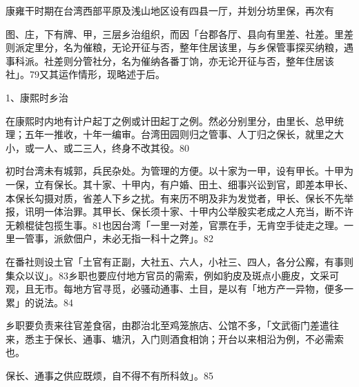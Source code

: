 
康雍干时期在台湾西部平原及浅山地区设有四县一厅，并划分坊里保，再次有

\vfill
\begin{BookNotes}
\end{BookNotes}

\noindent 图、庄，下有牌、甲，三层乡治组织，而因「台郡各厅、县向有里差、社差。里差则派定里分，名为催粮，无论开征与否，整年住居该里，与乡保管事探买纳粮，遇事科派。社差则分管社分，名为催纳各番丁饷，亦无论开征与否，整年住居该社」。79又其运作情形，现略述于后。

1、康熙时乡治

在康熙时内地有计户起丁之例或计田起丁之例。然必分别里分，由里长、总甲统理；五年一推收，十年一编审。台湾田园则归之管事、人丁归之保长，就里之大小，或一人、或二三人，终身不改其役。80

初时台湾未有城郭，兵民杂处。为管理的方便。以十家为一甲，设有甲长。十甲为一保，立有保长。其十家、十甲内，有户婚、田土、细事兴讼到官，即差本甲长、本保长勾摄对质，省差人下乡之扰。有来历不明及非为发觉者，甲长、保长不先举报，讯明一体治罪。其甲长、保长须十家、十甲内公举殷实老成之人充当，断不许无赖棍徒包揽生事。81也因台湾「一里一对差，官票在手，无肯空手徒走之理。一里一管事，派歛佃户，未必无指一科十之弊」。82

在番社则设土官「土官有正副，大社五、六人，小社三、四人，各分公廨，有事则集众以议」。83乡职也要应付地方官员的需索，例如豹皮及斑点小鹿皮，文采可观，且无市。每地方官寻觅，必骚动通事、土目，是以有「地方产一异物，便多一累」的说法。84

乡职要负责来往官差食宿，由郡治北至鸡笼旅店、公馆不多，「文武衙门差遣往来，悉主于保长、通事、塘汛，入门则酒食相饷；开台以来相沿为例，不必需索也。

\vfill
\begin{BookNotes}
\end{BookNotes}

\noindent 保长、通事之供应既烦，自不得不有所科敛」。85

